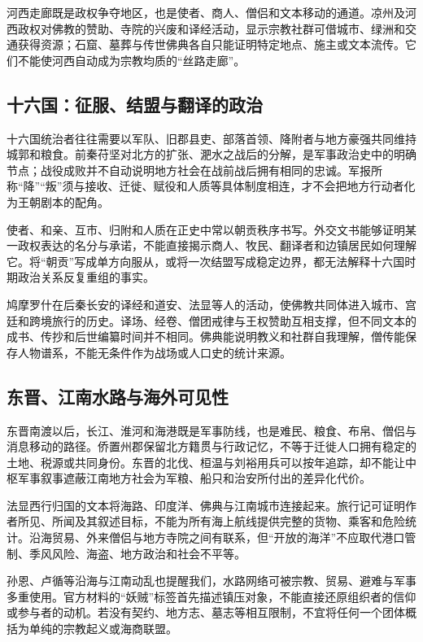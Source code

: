 河西走廊既是政权争夺地区，也是使者、商人、僧侣和文本移动的通道。凉州及河西政权对佛教的赞助、寺院的兴废和译经活动，显示宗教社群可借城市、绿洲和交通获得资源；石窟、墓葬与传世佛典各自只能证明特定地点、施主或文本流传。它们不能使河西自动成为宗教均质的“丝路走廊”。

\subsection{十六国：征服、结盟与翻译的政治}

十六国统治者往往需要以军队、旧郡县吏、部落首领、降附者与地方豪强共同维持城郭和粮食。前秦苻坚对北方的扩张、淝水之战后的分解，是军事政治史中的明确节点；战役成败并不自动说明地方社会在战前战后拥有相同的忠诚。军报所称“降”“叛”须与接收、迁徙、赋役和人质等具体制度相连，才不会把地方行动者化为王朝剧本的配角。

使者、和亲、互市、归附和人质在正史中常以朝贡秩序书写。外交文书能够证明某一政权表达的名分与承诺，不能直接揭示商人、牧民、翻译者和边镇居民如何理解它。将“朝贡”写成单方向服从，或将一次结盟写成稳定边界，都无法解释十六国时期政治关系反复重组的事实。

鸠摩罗什在后秦长安的译经和道安、法显等人的活动，使佛教共同体进入城市、宫廷和跨境旅行的历史。译场、经卷、僧团戒律与王权赞助互相支撑，但不同文本的成书、传抄和后世编纂时间并不相同。佛典能说明教义和社群自我理解，僧传能保存人物谱系，不能无条件作为战场或人口史的统计来源。

\subsection{东晋、江南水路与海外可见性}

东晋南渡以后，长江、淮河和海港既是军事防线，也是难民、粮食、布帛、僧侣与消息移动的路径。侨置州郡保留北方籍贯与行政记忆，不等于迁徙人口拥有稳定的土地、税源或共同身份。东晋的北伐、桓温与刘裕用兵可以按年追踪，却不能让中枢军事叙事遮蔽江南地方社会为军粮、船只和治安所付出的差异化代价。

法显西行归国的文本将海路、印度洋、佛典与江南城市连接起来。旅行记可证明作者所见、所闻及其叙述目标，不能为所有海上航线提供完整的货物、乘客和危险统计。沿海贸易、外来僧侣与地方寺院之间有联系，但“开放的海洋”不应取代港口管制、季风风险、海盗、地方政治和社会不平等。

孙恩、卢循等沿海与江南动乱也提醒我们，水路网络可被宗教、贸易、避难与军事多重使用。官方材料的“妖贼”标签首先描述镇压对象，不能直接还原组织者的信仰或参与者的动机。若没有契约、地方志、墓志等相互限制，不宜将任何一个团体概括为单纯的宗教起义或海商联盟。

